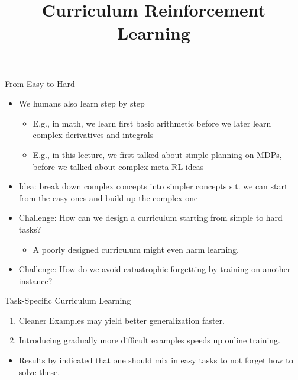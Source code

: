\documentclass[aspectratio=169]{../latex_main/tntbeamer}  %
\title[Curriculum RL]{Curriculum Reinforcement Learning}
\begin{document}
	
	\maketitle

\begin{frame}[c]{From Easy to Hard}


\begin{itemize}
	\item We humans also learn step by step
	\begin{itemize}
		\item E.g., in math, we learn first basic arithmetic before we later learn complex derivatives and integrals
		\item E.g., in this lecture, we first talked about simple planning on MDPs, before we talked about complex meta-RL ideas
	\end{itemize}
	\smallskip
	\item \alert{Idea:} break down complex concepts into simpler concepts s.t. we can start from the easy ones and build up the complex one
	\item \alert{Challenge}: How can we design a curriculum starting from simple to hard tasks?
	\begin{itemize}
		\item A poorly designed curriculum might even harm learning.
	\end{itemize}
	\item \alert{Challenge}: How do we avoid catastrophic forgetting by training on another instance?
\end{itemize}


\end{frame}
\begin{frame}[c]{Task-Specific Curriculum Learning~}

	\begin{enumerate}
		\item Cleaner Examples may yield better generalization faster.
		\item Introducing gradually more difficult examples speeds up online training.
	\end{enumerate}

	\begin{itemize}
		\item Results by  indicated that one should mix in easy tasks to not forget how to solve these.
	\end{itemize}

	
\end{frame}
\end{document}
